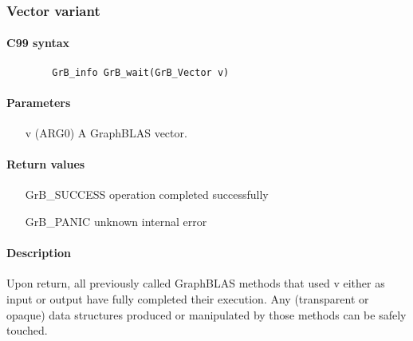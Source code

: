 \subsubsection{Vector variant}

\paragraph{C99 syntax}

\begin{verbatim}
        GrB_info GrB_wait(GrB_Vector v)
\end{verbatim}

\paragraph{Parameters}

\begin{itemize}[leftmargin=1.1in]
	\item[{\sf v}]	({\sf ARG0}) A GraphBLAS vector.
\end{itemize}

\paragraph{Return values}
\begin{itemize}[leftmargin=2.1in]
\item[{\sf GrB\_SUCCESS}]	operation completed successfully
\item[{\sf GrB\_PANIC}]		unknown internal error
\end{itemize}

\paragraph{Description}

Upon return, all previously called GraphBLAS methods that used {\sf v} either as input or output have fully completed their execution.
Any (transparent or opaque) data structures produced or manipulated by those methods can be safely touched.
